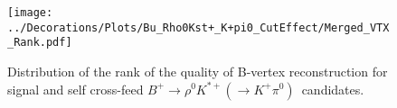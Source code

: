 \clearpage
\begin{figure}[p]
\centering
\texttt{[image: ../Decorations/Plots/Bu\_Rho0Kst+\_K+pi0\_CutEffect/Merged\_VTX\_Rank.pdf]}\\
\caption{Distribution of the rank of the quality of B-vertex reconstruction for signal and self cross-feed $B^+\to\rho^0K^{*+}(\to K^+\pi^0)$\ candidates.}
\end{figure}
\clearpage